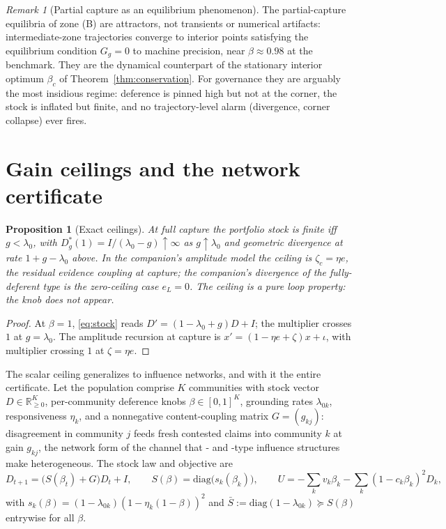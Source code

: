 \documentclass[11pt]{article}
\newtheorem{proposition}[theorem]{Proposition}
\theoremstyle{definition}
\theoremstyle{remark}
\newtheorem{remark}[theorem]{Remark}
\numberwithin{equation}{section}
\newcommand{\R}{\mathbb{R}}
\begin{document}
\begin{remark}[Partial capture as an equilibrium phenomenon]\label{rem:partial}
The partial-capture equilibria of zone (B) are attractors, not transients or numerical artifacts: intermediate-zone trajectories converge to interior points satisfying the equilibrium condition $G_g=0$ to machine precision, near $\beta\approx0.98$ at the benchmark. They are the dynamical counterpart of the stationary interior optimum $\beta_c$ of Theorem~\ref{thm:conservation}. For governance they are arguably the most insidious regime: deference is pinned high but not at the corner, the stock is inflated but finite, and no trajectory-level alarm (divergence, corner collapse) ever fires.
\end{remark}

\section{Gain ceilings and the network certificate}\label{sec:ceilings}

\begin{proposition}[Exact ceilings]\label{prop:ceiling}
At full capture the portfolio stock is finite iff $g<\lambda_0$, with $D^\ast_g(1)=I/(\lambda_0-g)\uparrow\infty$ as $g\uparrow\lambda_0$ and geometric divergence at rate $1+g-\lambda_0$ above. In the companion's amplitude model the ceiling is $\zeta_c=\eta e$, the residual evidence coupling at capture; the companion's divergence of the fully-deferent type is the zero-ceiling case $e_L=0$. The ceiling is a pure loop property: the knob does not appear.
\end{proposition}

\begin{proof}
At $\beta=1$, \eqref{eq:stock} reads $D'=(1-\lambda_0+g)D+I$; the multiplier crosses $1$ at $g=\lambda_0$. The amplitude recursion at capture is $x'=(1-\eta e+\zeta)x+\iota$, with multiplier crossing $1$ at $\zeta=\eta e$.
\end{proof}

The scalar ceiling generalizes to influence networks, and with it the entire certificate. Let the population comprise $K$ communities with stock vector $D\in\R^K_{\ge0}$, per-community deference knobs $\beta\in[0,1]^K$, grounding rates $\lambda_{0k}$, responsiveness $\eta_k$, and a nonnegative content-coupling matrix $G=(g_{kj})$: disagreement in community $j$ feeds fresh contested claims into community $k$ at gain $g_{kj}$, the network form of the channel that \citet{degroot1974reaching}- and \citet{friedkin1990social}-type influence structures make heterogeneous. The stock law and objective are
\begin{equation}\label{eq:netstock}
D_{t+1} = \bigl(S(\beta_t)+G\bigr)D_t + I,
\qquad
S(\beta)=\mathrm{diag}\bigl(s_k(\beta_k)\bigr),
\qquad
U=-\sum_k v_k\beta_k-\sum_k(1-c_k\beta_k)^2D_k,
\end{equation}
with $s_k(\beta)=(1-\lambda_{0k})(1-\eta_k(1-\beta))^2$ and $\bar S:=\mathrm{diag}(1-\lambda_{0k})\succeq S(\beta)$ entrywise for all $\beta$.
\end{document}
